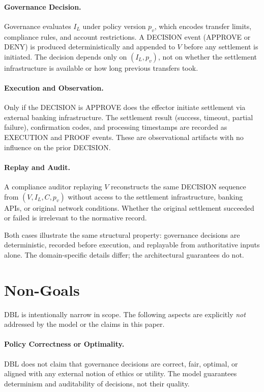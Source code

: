 \documentclass[11pt]{article}
\begin{document}
\paragraph{Governance Decision.}
Governance evaluates $I_L$ under policy version $p_v$, which encodes transfer limits, compliance rules, and account restrictions. A DECISION event (APPROVE or DENY) is produced deterministically and appended to $V$ before any settlement is initiated. The decision depends only on $(I_L, p_v)$, not on whether the settlement infrastructure is available or how long previous transfers took.

\paragraph{Execution and Observation.}
Only if the DECISION is APPROVE does the effector initiate settlement via external banking infrastructure. The settlement result (success, timeout, partial failure), confirmation codes, and processing timestamps are recorded as EXECUTION and PROOF events. These are observational artifacts with no influence on the prior DECISION.

\paragraph{Replay and Audit.}
A compliance auditor replaying $V$ reconstructs the same DECISION sequence from $(V, I_L, C, p_v)$ without access to the settlement infrastructure, banking APIs, or original network conditions. Whether the original settlement succeeded or failed is irrelevant to the normative record.

\medskip
Both cases illustrate the same structural property: governance decisions are deterministic, recorded before execution, and replayable from authoritative inputs alone. The domain-specific details differ; the architectural guarantees do not.

\section{Non-Goals}

DBL is intentionally narrow in scope. The following aspects are explicitly \emph{not} addressed by the model or the claims in this paper.

\paragraph{Policy Correctness or Optimality.}
DBL does not claim that governance decisions are correct, fair, optimal, or aligned with any external notion of ethics or utility. The model guarantees determinism and auditability of decisions, not their quality.
\end{document}
